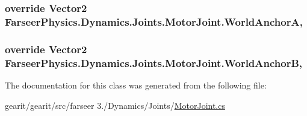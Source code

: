 \hypertarget{class_farseer_physics_1_1_dynamics_1_1_joints_1_1_motor_joint_a87868c8580e42a737cb366c2d43e1810}{
\subsubsection[{World\+Anchor\+A}]{\setlength{\rightskip}{0pt plus 5cm}override Vector2 Farseer\+Physics.\+Dynamics.\+Joints.\+Motor\+Joint.\+World\+Anchor\+A\hspace{0.3cm}{\ttfamily [get]}, {\ttfamily [set]}}}\label{class_farseer_physics_1_1_dynamics_1_1_joints_1_1_motor_joint_a87868c8580e42a737cb366c2d43e1810}
\hypertarget{class_farseer_physics_1_1_dynamics_1_1_joints_1_1_motor_joint_a2de0ddbd0e806836e61200eef86dc8eb}{
\subsubsection[{World\+Anchor\+B}]{\setlength{\rightskip}{0pt plus 5cm}override Vector2 Farseer\+Physics.\+Dynamics.\+Joints.\+Motor\+Joint.\+World\+Anchor\+B\hspace{0.3cm}{\ttfamily [get]}, {\ttfamily [set]}}}\label{class_farseer_physics_1_1_dynamics_1_1_joints_1_1_motor_joint_a2de0ddbd0e806836e61200eef86dc8eb}


The documentation for this class was generated from the following file\+:\begin{DoxyCompactItemize}
\item 
gearit/gearit/src/farseer 3./\+Dynamics/\+Joints/\hyperlink{_motor_joint_8cs}{Motor\+Joint.\+cs}\end{DoxyCompactItemize}
